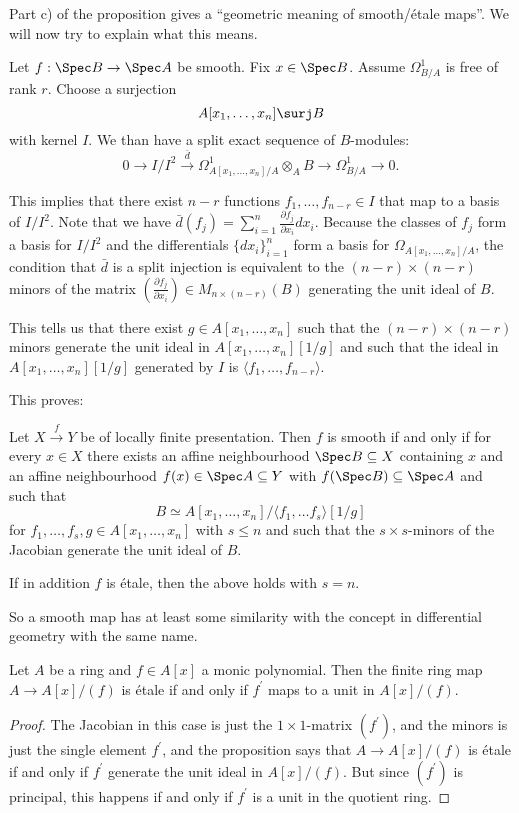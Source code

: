 \documentclass[11pt, english]{article}
\begin{document}
Part c) of the proposition gives a ``geometric meaning of smooth/étale maps''. We will now try to explain what this means.

Let $f: \Spec B \to \Spec A$ be smooth. Fix $x \in \Spec B$. Assume $\Omega_{B/A}^1$ is free of rank $r$. Choose a surjection 
\[
A[x_1,\dotsc, x_n] \surj B
\]
with kernel $I$. We than have a split exact sequence of $B$-modules:
\[
0 \to I/I^2 \xrightarrow{\bar{d}} \Omega_{A[x_1,\dotsc,x_n]/A}^1 \otimes_A B \to \Omega_{B/A}^1 \to 0 .
\]

This implies that there exist $n-r$ functions $f_1,\dotsc, f_{n-r} \in I$ that map to a basis of $I/I^2$. Note that we have $\bar{d}(f_j) = \sum_{i=1}^n \frac{\partial f_j}{\partial x_i} dx_i$. Because the classes of $f_j$ form a basis for $I/I^2$ and the differentials $\{ dx_i \}_{i=1}^n$ form a basis for $\Omega_{A[x_1,\dotsc,x_n]/A}$, the condition that $\bar{d}$ is a split injection is equivalent to the $(n-r) \times (n-r)$ minors of the matrix $(\frac{\partial f_j}{\partial x_i}) \in M_{n \times (n-r)}(B)$ generating the unit ideal of $B$.

This tells us that there exist $g \in A[x_1,\dotsc,x_n]$ such that the $(n-r)\times(n-r)$ minors generate the unit ideal in $A[x_1,\dotsc,x_n][1/g]$ and such that the ideal in $A[x_1,\dotsc,x_n][1/g]$ generated by $I$ is $\langle f_1, \dotsc, f_{n-r} \rangle$.

This proves:

\begin{prop}
Let $X \xrightarrow{f} Y$ be of locally finite presentation. Then $f$ is smooth if and only if for every $x \in X$ there exists an affine neighbourhood $\Spec B \subseteq X$ containing $x$ and an affine neighbourhood $f(x) \in \Spec A \subseteq Y$ with $f(\Spec B) \subseteq \Spec A$ and such that 
\[
B \simeq A[x_1,\dotsc, x_n]/\langle f_1, \dotsc f_s \rangle  [1/g]
\]
for $f_1, \dotsc, f_s,g \in A[x_1,\dotsc, x_n]$ with $s \leq n$ and such that the $s \times s$-minors of the Jacobian generate the unit ideal of $B$.

If in addition $f$ is étale, then the above holds with $s=n$. 
\end{prop} 

So a smooth map has at least some similarity with the concept in differential geometry with the same name.

\begin{corr}
Let $A$ be a ring and $f \in A[x]$ a monic polynomial. Then the finite ring map $A \to A[x]/(f)$ is étale if and only if $f^\prime$ maps to a unit in $A[x]/(f)$.
\end{corr}
\begin{proof}
The Jacobian in this case is just the $1 \times 1$-matrix $(f^\prime)$, and the minors is just the single element $f^\prime$, and the proposition says that $A \to A[x]/(f)$ is étale if and only if $f^\prime$ generate the unit ideal in $A[x]/(f)$. But since $(f^\prime)$ is principal, this happens if and only if $f^\prime$ is a unit in the quotient ring. 
\end{proof}
\end{document}
